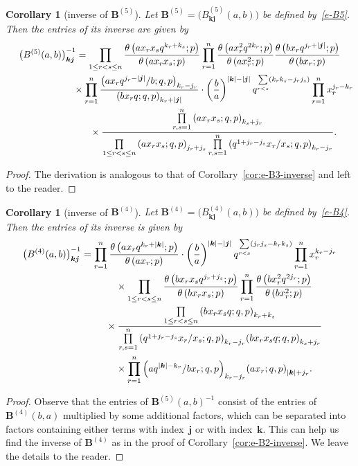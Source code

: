 \documentclass[pdftex]{sigma}
\numberwithin{equation}{section}
\newtheorem{Corollary}[Theorem]{Corollary}
\newcommand\sumj{{\left| \boldsymbol {j} \right|}}
\newcommand\sumk{{\left| \boldsymbol{k} \right|}}
\newcommand{\B}{{ \mathbf B}}
\renewcommand{\k}{{ \boldsymbol{k}}}
\renewcommand{\j}{{ \boldsymbol{j}}}
\newcommand{\triprod}[1]{\prod\limits_{1\le r < s \le #1}}
\newcommand{\sqprod}[1]{\prod\limits_{r, s =1}^{#1}} %
\newcommand{\smallprod}[1]{\prod\limits_{r =1}^{#1}} %
\newcommand{\xover}[1]{#1_{r}/#1_{s}}
\newcommand{\ellipticqrfac}[2]{{\left({#1}; q, p\right)_{#2}}} %
\newcommand{\elliptictheta}[1]{\theta \left({#1} ; p\right) }
\begin{document}
\begin{Corollary}[inverse of $\B^{(5)}$]Let $\B^{(5)}= \big(B^{(5)}_{\k\j}(a,b)\big)$ be defined by~\eqref{e-B5}. Then the entries of its inverse are given by
\begin{gather}
\big(B^{(5)}(a,b)\big)_{\k \j}^{-1} =
\triprod n
\frac{\elliptictheta{ax_rx_sq^{k_r+k_s}}}{\elliptictheta{ax_rx_s}}
\smallprod n
\frac{\elliptictheta{ax_r^2q^{2k_r}}}{\elliptictheta{ax_r^2}}
\frac{\elliptictheta{bx_rq^{j_r+\sumj}}}{\elliptictheta{bx_r}}\nonumber\\
\hphantom{\big(B^{(5)}(a,b)\big)_{\k \j}^{-1} =}{} \times
\smallprod n \frac{\ellipticqrfac{ax_rq^{j_r-\sumj}/b}{k_r-j_r}}
{\ellipticqrfac{bx_rq}{k_r+\sumj}} \cdot \left( \frac{b}{a}\right)^{\sumk-\sumj} q^{\sum\limits_{r<s} (k_r k_s-j_rj_s)}
\smallprod n x_r^{j_r-k_r}\nonumber\\
\hphantom{\big(B^{(5)}(a,b)\big)_{\k \j}^{-1} =}{} \times
 \frac{\sqprod n \ellipticqrfac{ax_rx_s}{k_s+j_r} }
 {\triprod n\ellipticqrfac{ax_rx_s}{j_r+j_s} \sqprod n \ellipticqrfac{q^{1+j_r-j_s}\xover x }{k_r-j_r}}.\label{e-B5-inverse}
\end{gather}
\end{Corollary}
\begin{proof}
The derivation is analogous to that of Corollary~\ref{cor:e-B3-inverse} and left to the reader.
\end{proof}

\begin{Corollary}[inverse of $\B^{(4)}$] Let $\B^{(4)}= \big(B^{(4)}_{\k\j}(a,b)\big)$ be defined by~\eqref{e-B4}. Then the entries of its inverse is given by
\begin{gather*}
\big(B^{(4)}(a,b)\big)_{\k \j}^{-1} =
\smallprod n \frac{\elliptictheta{ax_rq^{k_r+\sumk}}}{\elliptictheta{ax_r}} \cdot
\left( \frac{b}{a}\right)^{\sumk-\sumj}
 q^{\sum\limits_{r<s}(j_rj_s- k_r k_s)}
\smallprod n x_r^{k_r-j_r}\\
\hphantom{\big(B^{(4)}(a,b)\big)_{\k \j}^{-1}=}{} \times
\triprod n
\frac{\elliptictheta{bx_rx_sq^{j_r+j_s}}}{\elliptictheta{bx_rx_s}}
\smallprod n
\frac{\elliptictheta{bx_r^2q^{2j_r}}}{\elliptictheta{bx_r^2}} \cr
\hphantom{\big(B^{(4)}(a,b)\big)_{\k \j}^{-1}=}{} \times
\frac{\triprod n \ellipticqrfac{bx_rx_sq}{k_r+k_s} }
 {\sqprod n \ellipticqrfac{q^{1+j_r-j_s}\xover x }{k_r-j_r} \ellipticqrfac{bx_rx_sq}{k_s+j_r} } \\
\hphantom{\big(B^{(4)}(a,b)\big)_{\k \j}^{-1}=}{}
\times \smallprod n \ellipticqrfac{aq^{\sumk-k_r}/bx_r}{k_r-j_r} \ellipticqrfac{ax_r}{\sumk+j_r}.%
\end{gather*}
\end{Corollary}
\begin{proof} Observe that the entries of $\B^{(5)}(a,b)^{-1}$ consist of the entries of $\B^{(4)}(b,a)$ multiplied by some additional factors, which can be separated into factors containing either terms with index~$\j$ or with index~$\k$. This can help us find the inverse of $\B^{(4)}$ as in the proof of Corollary~\ref{cor:e-B2-inverse}. We leave the details to the reader.
\end{proof}
\end{document}
